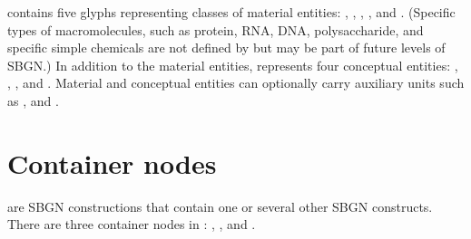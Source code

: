 \SBGNPDLone{} contains five glyphs representing classes of material entities: , , , , and .  (Specific types of macromolecules, such as protein, RNA, DNA, polysaccharide, and specific simple chemicals are not defined by \SBGNPDLone but may be part of future levels of SBGN.)  In addition to the material entities, \SBGNPDLone{} represents four conceptual entities: , , , and .  Material and conceptual entities can optionally carry auxiliary units such as ,  and .




















\section{Container nodes}\label{sec:CNs}

 are SBGN constructions that contain one or several other SBGN constructs.  There are three container nodes in \SBGNPDLone: , , and .







